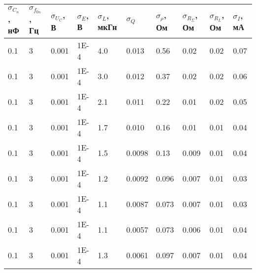 \documentclass[a4paper]{article}
\begin{document}
\begin{table}[h]
	\centering
	\begin{tabular}{|l|l|l|l|l|l|l|l|l|l|}
		\hline
		$\sigma_{C_n}$, нФ & $\sigma_{f_{0 n}}$, Гц & $\sigma_{U_C}$, В & $\sigma_E$, В & $\sigma_L$, мкГн & $\sigma_Q$ & $\sigma_\rho$, Ом & $\sigma_{R_\Sigma}$, Ом & $\sigma_{R_L}$, Ом & $\sigma_I$, мА \\ \hline
		0.1                & 3                      & 0.001             & 1E-4          & 4.0              & 0.013      & 0.56              & 0.02                    & 0.02               & 0.07           \\ \hline
		0.1                & 3                      & 0.001             & 1E-4          & 3.0              & 0.012      & 0.37              & 0.02                    & 0.02               & 0.06           \\ \hline
		0.1                & 3                      & 0.001             & 1E-4          & 2.1              & 0.011      & 0.22              & 0.01                    & 0.02               & 0.05           \\ \hline
		0.1                & 3                      & 0.001             & 1E-4          & 1.7              & 0.010      & 0.16              & 0.01                    & 0.01               & 0.04           \\ \hline
		0.1                & 3                      & 0.001             & 1E-4          & 1.5              & 0.0098     & 0.13              & 0.009                   & 0.01               & 0.04           \\ \hline
		0.1                & 3                      & 0.001             & 1E-4          & 1.2              & 0.0092     & 0.096             & 0.007                   & 0.01               & 0.03           \\ \hline
		0.1                & 3                      & 0.001             & 1E-4          & 1.1              & 0.0087     & 0.073             & 0.007                   & 0.01               & 0.03           \\ \hline
		0.1                & 3                      & 0.001             & 1E-4          & 1.1              & 0.0057     & 0.073             & 0.006                   & 0.01               & 0.04           \\ \hline
		0.1                & 3                      & 0.001             & 1E-4          & 1.3              & 0.0061     & 0.097             & 0.007                   & 0.01               & 0.04           \\ \hline

\end{tabular}
\end{table}
\end{document}
